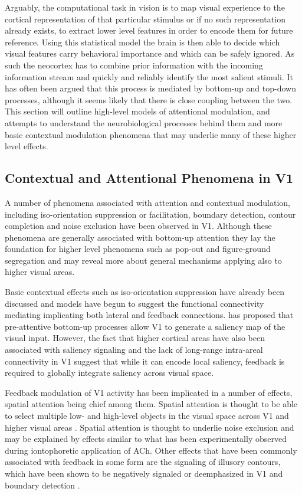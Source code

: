 Arguably, the computational task in vision is to map visual experience to the
cortical representation of that particular stimulus or if no such
representation already exists, to extract lower level features in order to
encode them for future reference. Using this statistical model the
brain is then able to decide which visual features carry behavioral
importance and which can be safely ignored. As such the neocortex has
to combine prior information with the incoming information stream and
quickly and reliably identify the most salient stimuli. It has often
been argued that this process is mediated by bottom-up and top-down
processes, although it seems likely that there is close coupling
between the two. This section will outline high-level models of
attentional modulation, and attempts to understand the neurobiological
processes behind them and more basic contextual modulation phenomena
that may underlie many of these higher level effects.

\subsection{Contextual and Attentional Phenomena in V1}

A number of phenomena associated with attention and contextual
modulation, including iso-orientation suppression or facilitation,
boundary detection, contour completion and noise exclusion have been
observed in V1. Although these phenomena are generally associated with
bottom-up attention they lay the foundation for higher level phenomena
such as pop-out and figure-ground segregation and may reveal more
about general mechanisms applying also to higher visual areas.

Basic contextual effects such as iso-orientation suppression have
already been discussed and models have begun to suggest the functional
connectivity mediating implicating both lateral and feedback
connections. \cite{Li2002} has proposed that pre-attentive
bottom-up processes allow V1 to generate a saliency map of the visual
input. However, the fact that higher cortical areas have also been
associated with saliency signaling and the lack of long-range
intra-areal connectivity in V1 suggest that while it can encode local
saliency, feedback is required to globally integrate saliency across
visual space.

Feedback modulation of V1 activity has been implicated in a number of
effects, spatial attention being chief among them. Spatial attention
is thought to be able to select multiple low- and high-level objects in
the visual space across V1 and higher visual areas
\citep{McMains2004}. Spatial attention is thought to underlie noise
exclusion \citep{Dosher2000} and may be explained by effects similar
to what has been experimentally observed during iontophoretic application
of ACh. Other effects that have been commonly associated with
feedback in some form are the signaling of illusory contours, which
have been shown to be negatively signaled or deemphasized in V1
\citep{Ramsden2001} and boundary detection \citep{Poort2012}.


